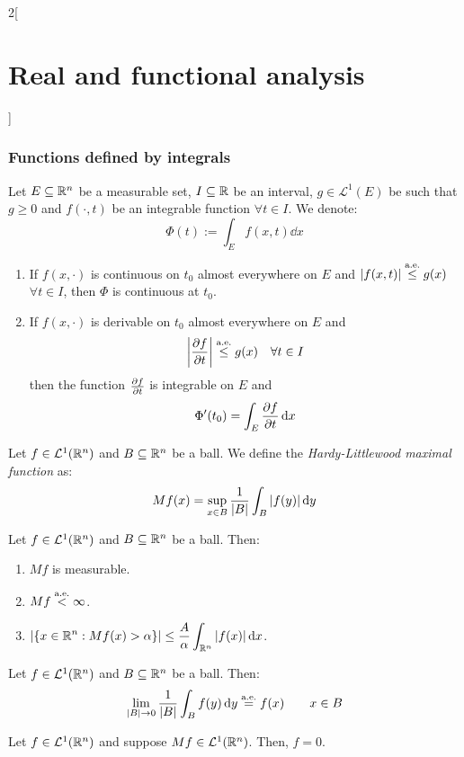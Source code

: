 \documentclass[../../../main_math.tex]{subfiles}
\begin{document}
\begin{multicols}{2}[\section{Real and functional analysis}]
  \subsubsection{Functions defined by integrals}
  \begin{theorem}
    Let $E\subseteq\mathbb{R}^n$ be a measurable set, $I\subseteq \mathbb{R}$ be an interval, $g\in \mathcal{L}^1(E)$ be such that $g\geq 0$ and $f(\cdot, t)$ be an integrable function $\forall t\in I$. We denote: $$\Phi(t):=\int_Ef(x,t)\dd{x}$$
    \begin{enumerate}
      \item If $f(x,\cdot)$ is continuous on $t_0$ almost everywhere on $E$ and $\abs{f(x,t)}\overset{\text{a.e.}}{\leq} g(x)$ $\forall t\in I$, then $\Phi$ is continuous at $t_0$.
      \item If $f(x,\cdot)$ is derivable on $t_0$ almost everywhere on $E$ and $$\abs{\pdv{f}{t}(x,t)}\overset{\text{a.e.}}{\leq} g(x)\quad\forall t\in I$$ then the function $\pdv{f}{t}(x,\cdot)$ is integrable on $E$ and $$\Phi'(t_0)=\int_E\pdv{f}{t}(x,t_0)\dd{x}$$
    \end{enumerate}
  \end{theorem}
  \begin{definition}
    Let $f\in \mathcal{L}^1(\mathbb{R}^n)$ and $B\subseteq \mathbb{R}^n$ be a ball. We define the \emph{Hardy-Littlewood maximal function} as: $$Mf(x)=\sup_{x\in B}\frac{1}{\m{B}}\int_B\abs{f(y)}\dd{y}$$
  \end{definition}
  \begin{theorem}
    Let $f\in \mathcal{L}^1(\mathbb{R}^n)$ and $B\subseteq \mathbb{R}^n$ be a ball. Then:
    \begin{enumerate}
      \item $Mf$ is measurable.
      \item $Mf\overset{\text{a.e.}}{<}\infty$.
      \item $\displaystyle\m{\{x\in\RR^n : Mf(x) > \alpha\}} \leq \frac{A}{\alpha}\int_{\RR^n} \abs{f(x)}\dd{x}$.
    \end{enumerate}
  \end{theorem}
  \begin{theorem}
    Let $f\in \mathcal{L}^1(\mathbb{R}^n)$ and $B\subseteq \mathbb{R}^n$ be a ball. Then: $$\lim_{\m{B}\to 0}\frac{1}{\m{B}}\int_Bf(y)\dd{y} \almoste{=} f(x) \qquad x\in  B$$
  \end{theorem}
  \begin{proposition}
    Let $f\in \mathcal{L}^1(\mathbb{R}^n)$ and suppose $Mf\in \mathcal{L}^1(\mathbb{R}^n)$. Then, $f=0$.
  \end{proposition}

\end{multicols}
\end{document}

